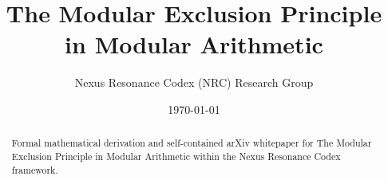 \documentclass[11pt,a4paper]{article}
\title{The Modular Exclusion Principle in Modular Arithmetic}
\author{Nexus Resonance Codex (NRC) Research Group}
\date{\today}
\begin{document}
\maketitle

\begin{abstract}
Formal mathematical derivation and self-contained arXiv whitepaper for The Modular Exclusion Principle in Modular Arithmetic within the Nexus Resonance Codex framework.
\end{abstract}





\end{document}
